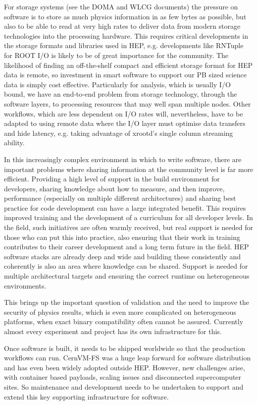 \documentclass[10pt,a4paper]{article}
\begin{document}
For storage systems (see the DOMA and WLCG documents) the pressure on
software is to store as much physics information in as few bytes as
possible, but also to be able to read at very high rates to deliver data
from modern storage technologies into the processing hardware. This
requires critical developments in the storage formats and libraries used
in HEP, e.g. developments like RNTuple for ROOT I/O is likely to be of
great importance for the community. The likelihood of finding an
off-the-shelf compact and efficient storage format for HEP data is
remote, so investment in smart software to support our PB sized science
data is simply cost effective. Particularly for analysis, which is
usually I/O bound, we have an end-to-end problem from storage
technology, through the software layers, to processing resources that
may well span multiple nodes. Other workflows, which are less dependent
on I/O rates will, nevertheless, have to be adapted to using remote data
where the I/O layer must optimise data transfers and hide latency, e.g.
taking advantage of xrootd's single column streaming ability.

In this increasingly complex environment in which to write software,
there are important problems where sharing information at the community
level is far more efficient. Providing a high level of support in the
build environment for developers, sharing knowledge about how to
measure, and then improve, performance (especially on multiple different
architectures) and sharing best practice for code development can have a
large integrated benefit. This requires improved training and the
development of a curriculum for all developer levels. In the field, such
initiatives are often warmly received, but real support is needed for
those who can put this into practice, also ensuring that their work in
training contributes to their career development and a long term future
in the field. HEP software stacks are already deep and wide and building
these consistently and coherently is also an area where knowledge can be
shared. Support is needed for multiple architectural targets and
ensuring the correct runtime on heterogeneous environments.

This brings up the important question of validation and the need to
improve the security of physics results, which is even more complicated
on heterogeneous platforms, when exact binary compatibility often cannot
be assured. Currently almost every experiment and project has its own
infrastructure for this.

Once software is built, it needs to be shipped worldwide so that the
production workflows can run. CernVM-FS was a huge leap forward for
software distribution and has even been widely adopted outside HEP.
However, new challenges arise, with container based payloads, scaling
issues and disconnected supercomputer sites. So maintenance and
development needs to be undertaken to support and extend this key
supporting infrastructure for software.
\end{document}
